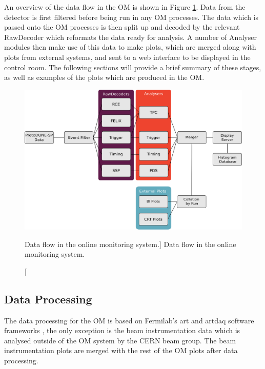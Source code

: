 An overview of the data flow in the OM is shown in Figure \ref{fig:om_flow}. 
Data from the detector is first filtered before being run in any OM processes. 
The data which is passed onto the OM processes is then split up and decoded by 
the relevant RawDecoder which reformats the data ready for analysis. A number 
of Analyser modules then make use of this data to make plots, which are merged 
along with plots from external systems, and sent to a web interface to be 
displayed in the control room. The following sections will provide a brief 
summary of these stages, as well as examples of the plots which are produced 
in the OM.

\begin{figure}

	\centering

	\includegraphics[width=\textwidth]{figures/om_flow.png}

	\caption
	[Data flow in the \protodune{} online monitoring system.]
	{Data flow in the \protodune{} online monitoring system.}

	\label{fig:om_flow}

\end{figure}

\subsection{Data Processing}
The data processing for the OM is based on Fermilab's art and artdaq software
frameworks \cite{Green:2012gv, 6495515}, the only exception is the beam 
instrumentation data which is analysed outside of the OM system by the CERN 
beam group. The beam instrumentation plots are merged with the rest of the OM 
plots after data processing.

